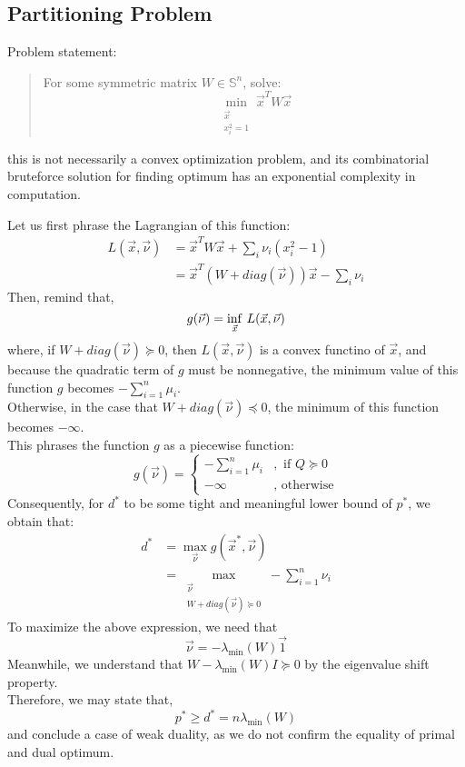\subsection{Partitioning Problem}
Problem statement:
\begin{quote}
    For some symmetric matrix $W \in \mathbb{S}^n$, solve:
    \[
        \min_{\substack{\vec{x} \\ x_i^2 = 1}} \vec{x}^T W \vec{x}
    \]
\end{quote}
this is not necessarily a convex optimization problem, and its combinatorial bruteforce solution for finding optimum has an exponential complexity in computation.

Let us first phrase the Lagrangian of this function:
\begin{align*}
    L(\vec{x}, \vec{\nu})
    &= \vec{x}^T W \vec{x} + \sum_i \nu_i (x_i^2 - 1) \\
    &= \vec{x}^T (W + diag(\vec{\nu})) \vec{x} - \sum_i \nu_i
\end{align*}
Then, remind that,
\[
    g(\vec{\nu}) = \underset{\vec{x}}{\rm inf}\ L(\vec{x}, \vec{\nu})
\]
where, if $W + diag(\vec{\nu}) \succcurlyeq 0$, then $L(\vec{x}, \vec{\nu})$ is a convex functino of $\vec{x}$, and because the quadratic term of $g$ must be nonnegative, the minimum value of this function $g$ becomes $-\sum_{i = 1}^n \mu_i$. \\
Otherwise, in the case that $W + diag(\vec{\nu}) \preccurlyeq 0$, the minimum of this function becomes $-\infty$. \\
This phrases the function $g$ as a piecewise function:
\[
    g(\vec{\nu}) = 
    \begin{cases}
        -\sum_{i = 1}^n \mu_i &,\text{ if } Q \succcurlyeq 0 \\
        -\infty &,\text{ otherwise}
    \end{cases}
\]
Consequently, for $d^*$ to be some tight and meaningful lower bound of $p^*$, we obtain that:
\begin{align*}
    d^*
    &= \max_{\vec{\nu}} g(\vec{x}^*, \vec{\nu}) \\
    &= \max_{\substack{\vec{\nu} \\ W + diag(\vec{\nu}) \succcurlyeq 0}} - \sum_{i = 1}^n \nu_i
\end{align*}
To maximize the above expression, we need that
\[
    \vec{\nu} = - \lambda_{\min} (W) \vec{1}
\]
Meanwhile, we understand that $W - \lambda_{\min} (W) I \succcurlyeq 0$ by the eigenvalue shift property. \\
Therefore, we may state that,
\[
    p^* \geq d^* = n \lambda_{\min} (W)
\]
and conclude a case of weak duality, as we do not confirm the equality of primal and dual optimum.

